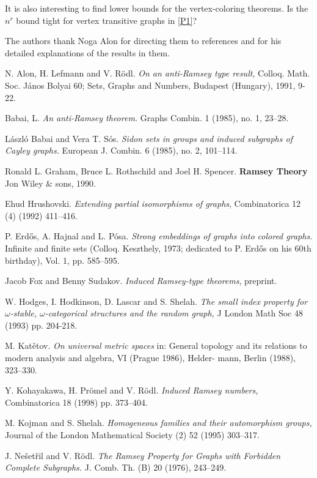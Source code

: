 \documentclass[11pt]{amsart}
\begin{document}
It is also interesting to find lower bounds for the
vertex-coloring theorems. Is the $n^r$ bound tight for vertex
transitive graphs in \ref{P1}?


\bigskip
The authors  thank Noga Alon for directing  them to references
\cite{ALR,B,BS,FS} and  for his  detailed explanations of the
results in them.


\begin{thebibliography}{99}

 N. Alon, H. Lefmann and V. R\"odl.
{\sl On an anti-Ramsey type result}, Colloq. Math. Soc. J\'anos
Bolyai 60; Sets, Graphs and Numbers, Budapest (Hungary), 1991,
9-22.


 Babai, L.
{\sl An anti-Ramsey theorem.} Graphs Combin. 1 (1985), no. 1,
23--28.


 L\'aszl\'o Babai and  Vera T. S\'os.
{\sl Sidon sets in groups and induced subgraphs of Cayley graphs.}
European J. Combin. 6 (1985), no. 2, 101--114.



 Ronald L. Graham, Bruce L. Rothschild and Joel
  H. Spencer. {\bf Ramsey Theory} Jon Wiley \& sons, 1990.

 Ehud Hrushovski. {\sl Extending partial isomorphisms of
  graphs}, Combinatorica  12 (4) (1992) 411--416.

 P. Erd\H os, A. Hajnal and L.  P\'osa. {\sl Strong
    embeddings of graphs into colored graphs.} Infinite and finite
  sets (Colloq. Keszthely, 1973; dedicated to P. Erd\H os on his 60th
  birthday), Vol. 1, pp. 585--595.

 Jacob Fox and Benny Sudakov. {\sl Induced Ramsey-type
    theorems}, preprint.


 W. Hodges, I. Hodkinson, D. Lascar and S. Shelah. {\sl
The
    small index property for $\omega $-stable, $\omega$-categorical
    structures and the random graph,} J London Math Soc 48 (1993)
    pp. 204-218.

 M. Kat\v etov. {\sl On universal metric spaces} in: General
topology and its
relations to modern analysis and algebra, VI (Prague 1986), Helder-
mann, Berlin (1988), 323--330.


 Y. Kohayakawa, H. Pr\"omel and V. R\"odl. {\sl Induced
    Ramsey numbers,} Combinatorica 18 (1998) pp. 373--404.

  M. Kojman and S. Shelah. {\sl Homogeneous families and
their
automorphism groups,} Journal of the London Mathematical Society (2)
52
(1995) 303--317.



 J. Ne\v set\v ril and V. R\"odl. {\sl The Ramsey
    Property for Graphs with Forbidden Complete Subgraphs.}
  J. Comb. Th. (B) 20 (1976), 243--249.



\end{thebibliography}
\end{document}
